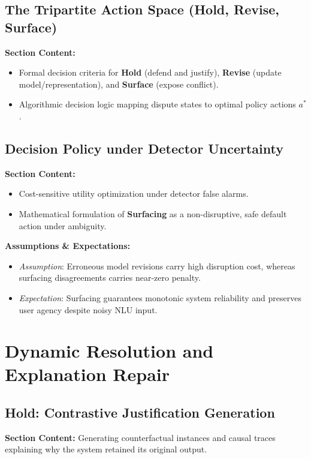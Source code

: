 \documentclass[preprint,12pt,3p,times]{elsarticle}
\begin{document}
\subsection{The Tripartite Action Space (Hold, Revise, Surface)}
\textbf{Section Content:}
\begin{itemize}
    \item Formal decision criteria for \textbf{Hold} (defend and justify), \textbf{Revise} (update model/representation), and \textbf{Surface} (expose conflict).
    \item Algorithmic decision logic mapping dispute states to optimal policy actions $a^*$.
\end{itemize}

\subsection{Decision Policy under Detector Uncertainty}
\textbf{Section Content:}
\begin{itemize}
    \item Cost-sensitive utility optimization under detector false alarms.
    \item Mathematical formulation of \textbf{Surfacing} as a non-disruptive, safe default action under ambiguity.
\end{itemize}

\textbf{Assumptions \& Expectations:}
\begin{itemize}
    \item \emph{Assumption}: Erroneous model revisions carry high disruption cost, whereas surfacing disagreements carries near-zero penalty.
    \item \emph{Expectation}: Surfacing guarantees monotonic system reliability and preserves user agency despite noisy NLU input.
\end{itemize}

\section{Dynamic Resolution and Explanation Repair}
\label{sec:resolution}

\subsection{Hold: Contrastive Justification Generation}
\textbf{Section Content:} Generating counterfactual instances and causal traces explaining why the system retained its original output.
\end{document}

